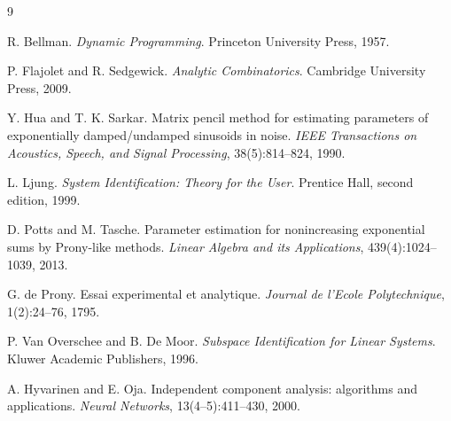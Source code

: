 \documentclass[10pt,twocolumn]{article}
\begin{document}
\begin{thebibliography}{9}

R. Bellman.
\newblock \emph{Dynamic Programming}.
\newblock Princeton University Press, 1957.

P. Flajolet and R. Sedgewick.
\newblock \emph{Analytic Combinatorics}.
\newblock Cambridge University Press, 2009.

Y. Hua and T. K. Sarkar.
\newblock Matrix pencil method for estimating parameters of exponentially
damped/undamped sinusoids in noise.
\newblock \emph{IEEE Transactions on Acoustics, Speech, and Signal Processing},
38(5):814--824, 1990.

L. Ljung.
\newblock \emph{System Identification: Theory for the User}.
\newblock Prentice Hall, second edition, 1999.

D. Potts and M. Tasche.
\newblock Parameter estimation for nonincreasing exponential sums by
Prony-like methods.
\newblock \emph{Linear Algebra and its Applications}, 439(4):1024--1039, 2013.

G. de Prony.
\newblock Essai experimental et analytique.
\newblock \emph{Journal de l'Ecole Polytechnique}, 1(2):24--76, 1795.

P. Van Overschee and B. De Moor.
\newblock \emph{Subspace Identification for Linear Systems}.
\newblock Kluwer Academic Publishers, 1996.

A. Hyvarinen and E. Oja.
\newblock Independent component analysis: algorithms and applications.
\newblock \emph{Neural Networks}, 13(4--5):411--430, 2000.

\end{thebibliography}
\end{document}
